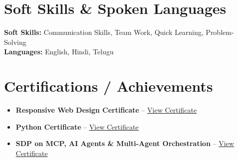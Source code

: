 \documentclass[letterpaper,11pt]{article}
\newcommand{\resumeItem}[1]{
  \item\small{
    {#1 \vspace{-2pt}}
  }
}
\newcommand{\resumeItemListStart}{\begin{itemize}[leftmargin=0.2in]}
\newcommand{\resumeItemListEnd}{\end{itemize}\vspace{-5pt}}
\begin{document}
\section{Soft Skills \& Spoken Languages}
 \begin{itemize}[leftmargin=0.15in, label={}]
    \small{\item{
     \textbf{Soft Skills:}{ Communication Skills, Team Work, Quick Learning, Problem-Solving} \\
     \textbf{Languages:}{ English, Hindi, Telugu}
    }}
 \end{itemize}

\section{Certifications / Achievements}
  \resumeItemListStart
    \resumeItem{\textbf{Responsive Web Design Certificate} -- \href{https://github.com/saranya-kollipara}{\underline{View Certificate}}}
    \resumeItem{\textbf{Python Certificate} -- \href{https://github.com/saranya-kollipara}{\underline{View Certificate}}}
    \resumeItem{\textbf{SDP on MCP, AI Agents \& Multi-Agent Orchestration} -- \href{https://github.com/saranya-kollipara}{\underline{View Certificate}}}
  \resumeItemListEnd
\end{document}
